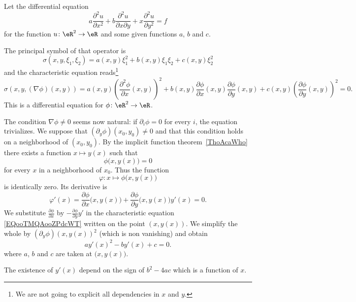 \begin{example}
    Let the differential equation
    \begin{equation}
        a\frac{ \partial^2u }{ \partial x^2 }+b\frac{ \partial^2u }{ \partial x\partial y }+x\frac{ \partial^2u }{ \partial y^2 }=f
    \end{equation}
    for the function \( u\colon \eR^2\to \eR\) and some given functions \( a\), \( b\) and \( c\).

    The principal symbol of that operator is
    \begin{equation}
        \sigma(x,y,\xi_1,\xi_2)=a(x,y)\xi_1^2+b(x,y)\xi_1\xi_2+c(x,y)\xi_2^2
    \end{equation}
    and the characteristic equation reads\footnote{We are not going to explicit all dependencies in \( x\) and \( y\).}
    \begin{equation}        \label{EQooTMQAooZPdcWT}
        \sigma(x,y,  (\nabla\phi)(x,y)   )=a(x,y)\left( \frac{ \partial^2\phi }{ \partial x }(x,y) \right)^2+b(x,y)\frac{ \partial \phi }{ \partial x }(x,y)\frac{ \partial \phi }{ \partial y }(x,y)+c(x,y)\left( \frac{ \partial \phi }{ \partial y }(x,y) \right)^2=0.
    \end{equation}
    This is a differential equation for \( \phi\colon \eR^2\to \eR\).

    The condition \( \nabla\phi\neq 0\) seems now natural: if \( \partial_i\phi=0\) for every \( i\), the equation trivializes. We suppose that \( (\partial_y\phi)(x_0,y_0)\neq 0\) and that this condition holds on a neighborhood of \( (x_0,y_0)\). By the implicit function theorem~\ref{ThoAcaWho} there exists a function \( x\mapsto y(x)\) such that
    \begin{equation}
        \phi\big( x,y(x) \big)=0
    \end{equation}
    for every \( x\) in a neighborhood of \( x_0\). Thus the function
    \begin{equation}
        \varphi\colon x\mapsto \phi\big( x,y(x) \big)
    \end{equation}
    is identically zero. Its derivative is
    \begin{equation}
        \varphi'(x)=\frac{ \partial \phi }{ \partial x }\big( x,y(x) \big)+\frac{ \partial \phi }{ \partial y }\big( x,y(x) \big)y'(x)=0.
    \end{equation}
    We substitute \( \frac{ \partial \phi }{ \partial x }\) by \( -\frac{ \partial \phi }{ \partial y }y'\) in the characteristic equation \eqref{EQooTMQAooZPdcWT} written on the point \( (x,y(x))\).  We simplify the whole by \( (\partial_y\phi)(x,y(x))^2\) (which is non vanishing) and obtain
    \begin{equation}
        ay'(x)^2-by'(x)+c=0.
    \end{equation}
    where \( a\), \( b\) and \( c\) are taken at \( \big( x,y(x) \big)\).

    The existence of \( y'(x)\) depend on the sign of \( b^2-4ac\) which is a function of \( x\).

\end{example}

